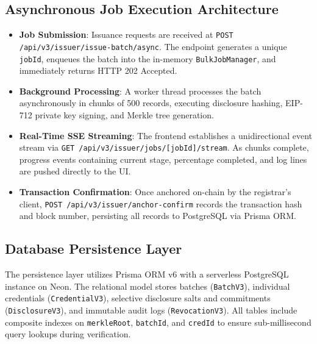 \subsection{Asynchronous Job Execution Architecture}
\begin{itemize}
    \item \textbf{Job Submission}: Issuance requests are received at \texttt{POST /api/v3/issuer/issue-batch/async}. The endpoint generates a unique \texttt{jobId}, enqueues the batch into the in-memory \texttt{BulkJobManager}, and immediately returns HTTP 202 Accepted.
    \item \textbf{Background Processing}: A worker thread processes the batch asynchronously in chunks of 500 records, executing disclosure hashing, EIP-712 private key signing, and Merkle tree generation.
    \item \textbf{Real-Time SSE Streaming}: The frontend establishes a unidirectional event stream via \texttt{GET /api/v3/issuer/jobs/[jobId]/stream}. As chunks complete, progress events containing current stage, percentage completed, and log lines are pushed directly to the UI.
    \item \textbf{Transaction Confirmation}: Once anchored on-chain by the registrar's client, \texttt{POST /api/v3/issuer/anchor-confirm} records the transaction hash and block number, persisting all records to PostgreSQL via Prisma ORM.
\end{itemize}

\subsection{Database Persistence Layer}
The persistence layer utilizes Prisma ORM v6 with a serverless PostgreSQL instance on Neon. The relational model stores batches (\texttt{BatchV3}), individual credentials (\texttt{CredentialV3}), selective disclosure salts and commitments (\texttt{DisclosureV3}), and immutable audit logs (\texttt{RevocationV3}). All tables include composite indexes on \texttt{merkleRoot}, \texttt{batchId}, and \texttt{credId} to ensure sub-millisecond query lookups during verification.
